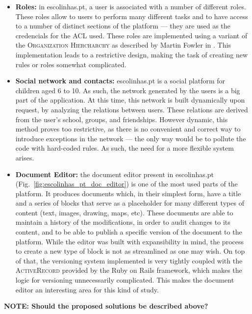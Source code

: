\begin{itemize}
  \item \textbf{Roles:} in escolinhas.pt, a user is associated with a number of different roles. These roles allow to users to perform many different tasks and to have access to a number of distinct sections of the platform --- they are used as the credencials for the ACL used. These roles are implemented using a variant of the \textsc{Organization Hiercharchy} as described by Martin Fowler in \cite{fowler_organization_hierarchy}. This implementation leads to a restrictive design, making the task of creating new rules or roles somewhat complicated. \\
  
  \item \textbf{Social network and contacts:} escolinhas.pt is a social platform for children aged 6 to 10. As such, the network generated by the users is a big part of the application. At this time, this network is built dynamically upon request, by analyzing the relations between users. These relations are derived from the user's school, groups, and friendships. However dynamic, this method proves too restrictive, as there is no convenient and correct way to introduce exceptions in the network --- the only way would be to pollute the code with hard-coded rules. As such, the need for a more flexible system arises. \\
  
  \item \textbf{Document Editor:} the document editor present in escolinhas.pt (Fig.~\ref{fig:escolinhas_pt_doc_editor}) is one of the most used parts of the platform. It produces documents which, in their simplest form, have a title and a series of blocks that serve as a placeholder for many different types of content (text, images, drawing, maps, etc). These documents are able to maintain a history of the modifications, in order to audit changes to its content, and to be able to publish a specific version of the document to the platform. While the editor was built with expansibility in mind, the process to create a new type of block is not as streamlined as one may wish. On top of that, the versioning system implemented is very tightly coupled with the \textsc{ActiveRecord} provided by the Ruby on Rails framework, which makes the logic for versioning unnecessarily complicated. This makes the document editor an interesting area for this kind of study. \\
\end{itemize}


\textbf{NOTE: Should the proposed solutions be described above?}

